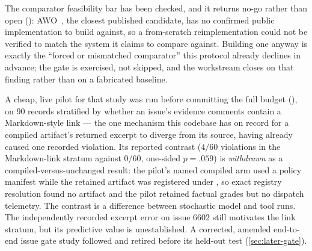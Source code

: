 The comparator feasibility bar has been checked, and it returns no-go rather than open
(): AWO~\cite{abuzakuk2026awo}, the closest
published candidate, has no confirmed public implementation to build against, so a
from-scratch reimplementation could not be verified to match the system it claims to
compare against.  Building one anyway is exactly the ``forced or mismatched comparator''
this protocol already declines in advance; the gate is exercised, not skipped, and the
workstream closes on that finding rather than on a fabricated baseline.

A cheap, live pilot for that study was run before committing the full budget
(), on 90 records stratified by whether an issue's
evidence comments contain a Markdown-style link --- the one mechanism this codebase has on
record for a compiled artifact's returned excerpt to diverge from its source, having
already caused one recorded violation.  Its reported contrast ($4/60$ violations in the
Markdown-link stratum against $0/60$, one-sided $p=.059$) is \emph{withdrawn} as a
compiled-versus-unchanged result: the pilot's named compiled arm used a 
policy manifest while the retained artifact was registered under , so exact
registry resolution found no artifact and the pilot retained factual grades but no dispatch
telemetry.  The contrast is a difference between stochastic model and tool runs.  The
independently recorded excerpt error on issue 6602 still motivates the link stratum, but
its predictive value is unestablished.  A corrected, amended end-to-end issue gate study
followed and retired before its held-out test (\cref{sec:later-gate}).

